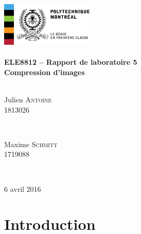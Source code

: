 \documentclass[12pt]{article}
\begin{document}
\begin{titlepage}
\centering
\includegraphics[width = 0.33\textwidth]{../../logo}\\[5cm] 
\centering
\HRule \\[0.4cm]
{ \huge \bfseries ELE8812 -- Rapport de laboratoire 5}\\[0.4cm] 
{ \Large \bfseries Compression d'images}\\
\HRule \\[1cm]
\begin{minipage}{0.45\textwidth}
\begin{center} 
\large
Julien \textsc{Antoine}\\
1813026
\end{center}
\end{minipage}
~
\begin{minipage}{0.45\textwidth}
\begin{center} 
\large
Maxime \textsc{Schmitt}\\
1719088
\end{center}
\end{minipage}\\[8cm]
\begin{center}
{\Large 6 avril 2016}
\end{center}
\vfill 
\end{titlepage}


\section{Introduction}
\end{document}
